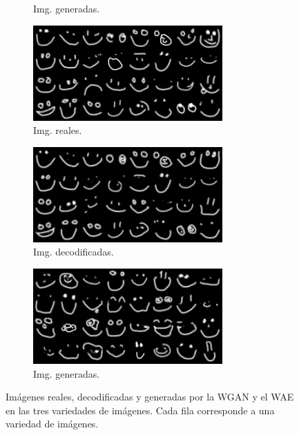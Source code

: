 \begin{figure}[H]
\begin{subfigure}[b]{0.32\textwidth}
        \caption{Img. generadas.}
        \label{fig:gen2}
    \end{subfigure}
    \begin{subfigure}[b]{0.32\textwidth}
        \centering
        \includegraphics[width=\textwidth]{img/wgan-wae/real3.png}
        \caption{Img. reales.}
        \label{fig:real3}
    \end{subfigure}
    \hfill
    \begin{subfigure}[b]{0.32\textwidth}
        \centering
        \includegraphics[width=\textwidth]{img/wgan-wae/decoded3.png}
        \caption{Img. decodificadas.}
        \label{fig:decoded3}
    \end{subfigure}
    \hfill
    \begin{subfigure}[b]{0.32\textwidth}
        \centering
        \includegraphics[width=\textwidth]{img/wgan-wae/gen3.png}
        \caption{Img. generadas.}
        \label{fig:gen3}
    \end{subfigure}
    \caption{Imágenes reales, decodificadas y generadas por la WGAN y el WAE en las tres variedades de imágenes. Cada fila corresponde a una variedad de imágenes.}
    \label{fig:generacion-imagenes}
\end{figure}

